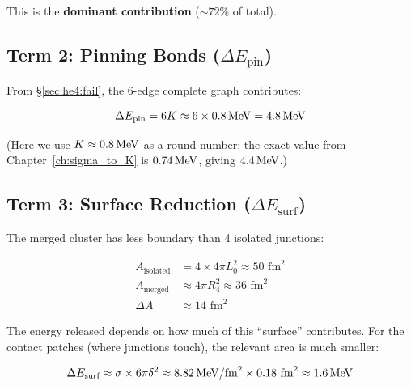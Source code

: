 \tagP

This is the \textbf{dominant contribution} ($\sim 72\%$ of total).

\subsection{Term 2: Pinning Bonds ($\Delta E_{\text{pin}}$)}
\label{sec:he4:pin}

From \S\ref{sec:he4:fail}, the 6-edge complete graph contributes:

\begin{equation}
    \Delta E_{\text{pin}} = 6K \approx 6 \times 0.8\,\mathrm{MeV} = 4.8\,\mathrm{MeV}
    \label{eq:pin_value}
\end{equation}

\tagDc

(Here we use $K \approx 0.8\,\mathrm{MeV}$ as a round number; the exact
value from Chapter~\ref{ch:sigma_to_K} is $0.74\,\mathrm{MeV}$, giving $4.4\,\mathrm{MeV}$.)

\subsection{Term 3: Surface Reduction ($\Delta E_{\text{surf}}$)}
\label{sec:he4:surf}

The merged cluster has less boundary than 4 isolated junctions:

\begin{derivationbox}
    \begin{align}
        A_{\text{isolated}} &= 4 \times 4\pi L_0^2 \approx 50\text{ fm}^2 \\
        A_{\text{merged}} &\approx 4\pi R_4^2 \approx 36\text{ fm}^2 \\
        \Delta A &\approx 14\text{ fm}^2
    \end{align}
    \tagP
\end{derivationbox}

The energy released depends on how much of this ``surface'' contributes.
For the contact patches (where junctions touch), the relevant area
is much smaller:

\begin{equation}
    \Delta E_{\text{surf}} \approx \sigma \times 6\pi\delta^2
    \approx 8.82\,\mathrm{MeV}/\text{fm}^2 \times 0.18\text{ fm}^2
    \approx 1.6\,\mathrm{MeV}
    \label{eq:surf_value}
\end{equation}

